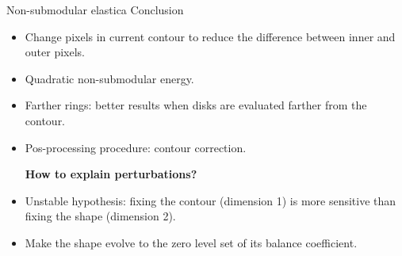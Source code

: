 \begin{frame}
{Non-submodular elastica}
{Conclusion}

\begin{itemize}
\item{Change pixels in current contour to reduce the difference between inner and outer pixels.}
\item{Quadratic non-submodular energy.}
\pause
\item{Farther rings: better results when disks are evaluated farther from the contour. }
\pause
\item{Pos-processing procedure: contour correction. }
\pause\vspace{1em}

\textbf{How to explain perturbations?}

\item{Unstable hypothesis: fixing the contour (dimension 1) is more sensitive than fixing the shape (dimension 2).}
\item{Make the shape evolve to the zero level set of its balance coefficient.}
\end{itemize}
\end{frame}


